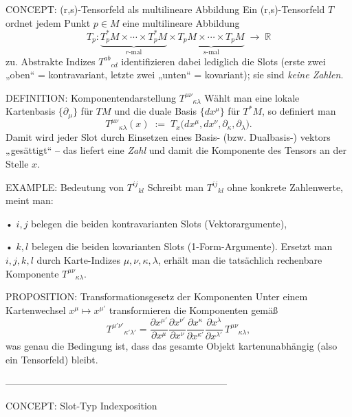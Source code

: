 \documentclass[10pt, letterpaper]{article}
\begin{document}
\pagebreak


CONCEPT: (r,s)-Tensorfeld als multilineare Abbildung  
Ein (r,s)-Tensorfeld \(T\) ordnet jedem Punkt \(p\in M\) eine multilineare
Abbildung  
\[
T_p : \underbrace{T_p^*M \times \dotsm \times T_p^*M}_{r\text{-mal}}
      \times
      \underbrace{T_p M \times \dotsm \times T_p M}_{s\text{-mal}}
      \;\longrightarrow\; \mathbb{R}
\]
zu.  Abstrakte Indizes \(T^{ab}{}_{cd}\) identifizieren dabei lediglich
die Slots (erste zwei „oben“ = kontravariant, letzte zwei „unten“ =
kovariant); sie sind \emph{keine Zahlen}.

DEFINITION: Komponentendarstellung \(T^{\mu\nu}{}_{\kappa\lambda}\)  
Wählt man eine lokale Kartenbasis \(\{\partial_\mu\}\) für \(TM\) und
die duale Basis \(\{dx^\mu\}\) für \(T^*M\), so definiert man  
\[
T^{\mu\nu}{}_{\kappa\lambda}(x)
\;:=\;
T_x\!\bigl(dx^\mu,dx^\nu,\partial_\kappa,\partial_\lambda\bigr).
\]
Damit wird jeder Slot durch Einsetzen eines Basis- (bzw. Dualbasis-)
vektors „gesättigt“ – das liefert eine \emph{Zahl} und damit die
Komponente des Tensors an der Stelle \(x\).

EXAMPLE: Bedeutung von \(T^{ij}{}_{kl}\)  
Schreibt man \(T^{ij}{}_{kl}\) ohne konkrete Zahlenwerte, meint man:

• \(i,j\) belegen die beiden kontravarianten Slots (Vektorargumente),  

• \(k,l\) belegen die beiden kovarianten Slots (1-Form-Argumente).  
Ersetzt man \(i,j,k,l\) durch Karte-Indizes \(\mu,\nu,\kappa,\lambda\),
erhält man die tatsächlich rechenbare Komponente
\(T^{\mu\nu}{}_{\kappa\lambda}\).

PROPOSITION: Transformationsgesetz der Komponenten  
Unter einem Kartenwechsel \(x^\mu \mapsto x^{\mu'}\) transformieren die
Komponenten gemäß  
\[
T^{\mu'\nu'}{}_{\kappa'\lambda'}
=
\frac{\partial x^{\mu'}}{\partial x^{\mu}}
\frac{\partial x^{\nu'}}{\partial x^{\nu}}
\frac{\partial x^{\kappa}}{\partial x^{\kappa'}}
\frac{\partial x^{\lambda}}{\partial x^{\lambda'}}
\,
T^{\mu\nu}{}_{\kappa\lambda},
\]
was genau die Bedingung ist, dass das gesamte Objekt
kartenunabhängig (also ein Tensorfeld) bleibt.



---------------------------------------------------------------------


CONCEPT: Slot-Typ Indexposition  
\end{document}
